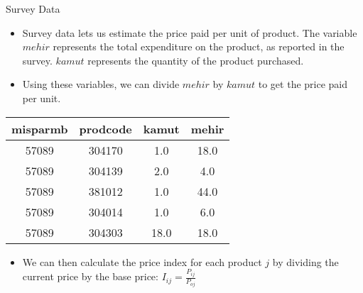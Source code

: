 \documentclass{beamer}
\begin{document}
\begin{frame}{Survey Data}
    \begin{itemize}
        \item Survey data lets us estimate the price paid per unit of product. The variable $mehir$ represents the total expenditure on the product, as reported in the survey. $kamut$ represents the quantity of the product purchased.
        \item Using these variables, we can divide $mehir$ by $kamut$ to get the price paid per unit.
    \end{itemize}
    \begin{table}[h]
        \centering
        \begin{tabular}{c c c c}
            \hline
            \textbf{misparmb} & \textbf{prodcode} & \textbf{kamut} & \textbf{mehir} \\
            \hline
            57089             & 304170            & 1.0            & 18.0           \\
            57089             & 304139            & 2.0            & 4.0            \\
            57089             & 381012            & 1.0            & 44.0           \\
            57089             & 304014            & 1.0            & 6.0            \\
            57089             & 304303            & 18.0           & 18.0           \\
            \hline
        \end{tabular}
        \label{tab:survey_table}
    \end{table}
    \begin{itemize}
        \item We can then calculate the price index for each product $j$ by dividing the current price by the base price: $I_{ij}=\frac{P_{ij}}{P_{oj}}$
    \end{itemize}
\end{frame}
\end{document}
